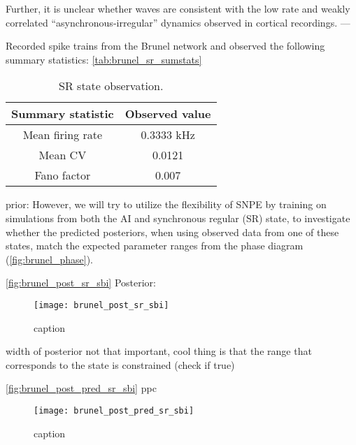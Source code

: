 Further, it is unclear whether waves are consistent with the low rate and weakly correlated “asynchronous-irregular” dynamics observed in cortical recordings. 
---

Recorded spike trains from the Brunel network and observed the following summary statistics: \autoref{tab:brunel_sr_sumstats}

\begin{table}[!htb]
  \caption{SR state observation.}
  \begin{center}
    \begin{tabular}{cc}
      \toprule
      \textbf{Summary statistic} & \textbf{Observed value} \\
      \midrule
      Mean firing rate &  0.3333 kHz \\
      Mean CV &  0.0121  \\
      Fano factor & 0.007  \\
      \bottomrule
    \end{tabular}
  \end{center}
  \label{tab:brunel_sr_sumstats}
\end{table}

prior: However, we will try to utilize the flexibility of SNPE by training on simulations from both the AI and synchronous regular (SR) state, to investigate whether the predicted posteriors, when using observed data from one of these states, match the expected parameter ranges from the phase diagram (\autoref{fig:brunel_phase}).

\autoref{fig:brunel_post_sr_sbi} Posterior:

\begin{figure}[!htb]
    \centering
    \texttt{[image: brunel\_post\_sr\_sbi]}
    \caption{caption}
    \label{fig:brunel_post_sr_sbi}
\end{figure}

width of posterior not that important, cool thing is that the range that corresponds to the state is constrained (check if true)

\autoref{fig:brunel_post_pred_sr_sbi} ppc 

\begin{figure}[H]
    \centering
    \texttt{[image: brunel\_post\_pred\_sr\_sbi]}
    \caption{caption}
    \label{fig:brunel_post_pred_sr_sbi}
\end{figure}









